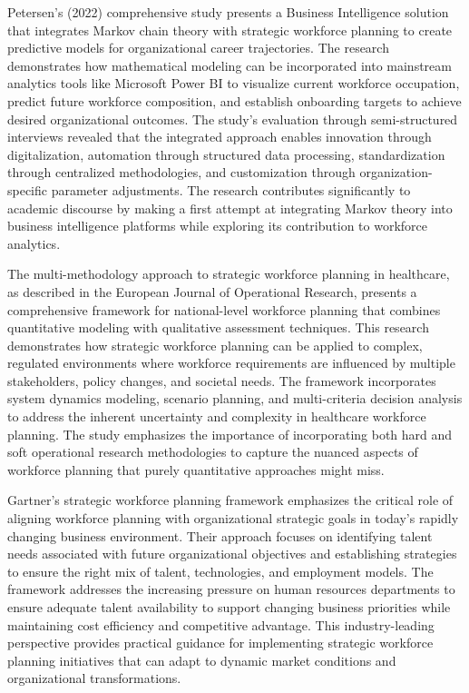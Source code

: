\documentclass[main.tex]{subfiles}
\begin{document}
Petersen's (2022) comprehensive study presents a Business Intelligence solution that integrates Markov chain theory with strategic workforce planning to create predictive models for organizational career trajectories\parencite{coursehero2024}. The research demonstrates how mathematical modeling can be incorporated into mainstream analytics tools like Microsoft Power BI to visualize current workforce occupation, predict future workforce composition, and establish onboarding targets to achieve desired organizational outcomes. The study's evaluation through semi-structured interviews revealed that the integrated approach enables innovation through digitalization, automation through structured data processing, standardization through centralized methodologies, and customization through organization-specific parameter adjustments. The research contributes significantly to academic discourse by making a first attempt at integrating Markov theory into business intelligence platforms while exploring its contribution to workforce analytics.

The multi-methodology approach to strategic workforce planning in healthcare, as described in the European Journal of Operational Research, presents a comprehensive framework for national-level workforce planning that combines quantitative modeling with qualitative assessment techniques\parencite{healthcare2018}. This research demonstrates how strategic workforce planning can be applied to complex, regulated environments where workforce requirements are influenced by multiple stakeholders, policy changes, and societal needs. The framework incorporates system dynamics modeling, scenario planning, and multi-criteria decision analysis to address the inherent uncertainty and complexity in healthcare workforce planning. The study emphasizes the importance of incorporating both hard and soft operational research methodologies to capture the nuanced aspects of workforce planning that purely quantitative approaches might miss.

Gartner's strategic workforce planning framework emphasizes the critical role of aligning workforce planning with organizational strategic goals in today's rapidly changing business environment\parencite{gartner2024}. Their approach focuses on identifying talent needs associated with future organizational objectives and establishing strategies to ensure the right mix of talent, technologies, and employment models. The framework addresses the increasing pressure on human resources departments to ensure adequate talent availability to support changing business priorities while maintaining cost efficiency and competitive advantage. This industry-leading perspective provides practical guidance for implementing strategic workforce planning initiatives that can adapt to dynamic market conditions and organizational transformations.
\end{document}
